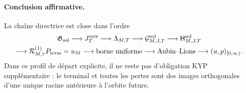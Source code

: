 \paragraph{Conclusion affirmative.}
La chaîne directrice est close dans l'ordre
\[
 \begin{gathered}
 \mathfrak G_{\rm sol}
 \longrightarrow J_T^{\rm mix}
 \longrightarrow\Lambda_{M,T}
 \longrightarrow\mathcal G_{M,J,T}^{\rm sol}
 \longrightarrow\mathsf H_{M,J,T}^{\rm sol}\\
 \longrightarrow\mathcal R_{M,\tau}^{(1)}P_{\rm term}=u_M
 \longrightarrow\text{borne uniforme}
 \longrightarrow\text{Aubin--Lions}
 \longrightarrow(u,p)_{[0,\infty)}.
 \end{gathered}
\]
Dans ce profil de départ explicite, il ne reste pas d'obligation KYP supplémentaire :
le terminal et toutes les pertes sont des images orthogonales d'une unique racine
antérieure à l'orbite future.
